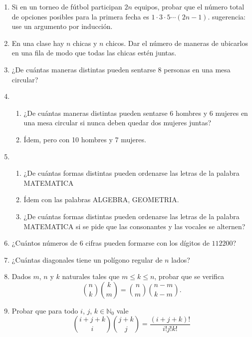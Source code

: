 \documentclass[a4paper,12pt,twoside,spanish,reqno]{amsbook}
\numberwithin{equation}{section}
\begin{document}
\begin {enumerate}
\item Si en un torneo de fútbol participan $2n$ equipos, probar que el número total de opciones posibles para la primera fecha es $1\cdot 3\cdot 5 \cdots (2n - 1)$. sugerencia: use un argumento por inducción. 


\item En una clase hay $n$ chicas y $n$ chicos. Dar el número de maneras de ubicarlos en una fila de modo que todas las chicas estén juntas.


\item ¿De cuántas maneras  distintas pueden sentarse 8 personas en una mesa circular?


\item 
    \begin{enumerate}
        \item ¿De cuántas maneras distintas pueden sentarse 6 hombres y 6 mujeres en una mesa circular si nunca deben quedar dos mujeres juntas?
        \item Ídem, pero con 10 hombres y 7 mujeres.
    \end{enumerate}


\item 
    \begin{enumerate}
        \item  ¿De cuántas formas distintas pueden ordenarse las letras de la palabra MATEMATICA
        \item Ídem con las palabras ALGEBRA, GEOMETRIA.
        \item ¿De cuántas formas distintas pueden ordenarse las letras de la palabra MATEMATICA si se pide que las consonantes y las vocales se alternen?
    \end{enumerate}


\item ¿Cuántos números de 6 cifras pueden formarse con los dígitos de $112200$?

\item ¿Cuántas diagonales tiene un polígono regular de $n$ lados?


\item Dados $m$, $n$ y $k$ naturales tales que $m \le k \le n$, probar que se verifica
    \begin{equation*}
        \binom{n}{k}\binom{k}{m} = \binom{n}{m}\binom{n-m}{k-m}.
    \end{equation*}



\item Probar que para todo $i$, $j$, $k \in {\mathbb N}_0$ vale
    \begin{equation*}
        \binom{i + j + k}{i}\binom{j+k}{j} = \frac{(i+j+k)!}{i!j!k!}
    \end{equation*}



\end{enumerate}
\end{document}
